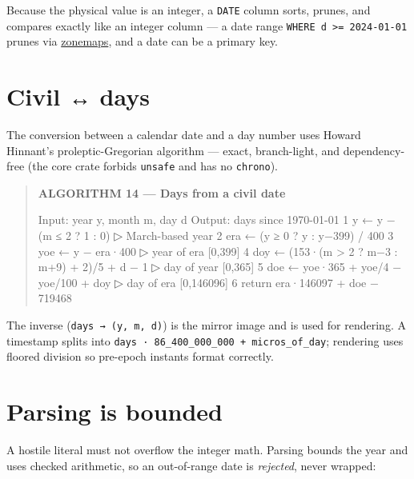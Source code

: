 \documentclass[
  11pt,
  openany]{book}
\newenvironment{Shaded}{}{}
\newcommand{\NormalTok}[1]{#1}
\begin{document}
Because the physical value is an integer, a \texttt{DATE} column sorts,
prunes, and compares exactly like an integer column --- a date range
\texttt{WHERE\ d\ \textgreater{}=\ \textquotesingle{}2024-01-01\textquotesingle{}}
prunes via \href{storage.md}{zonemaps}, and a date can be a primary key.

\section{Civil ↔ days}\label{civil-days}

The conversion between a calendar date and a day number uses Howard
Hinnant's proleptic-Gregorian algorithm --- exact, branch-light, and
dependency-free (the core crate forbids \texttt{unsafe} and has no
\texttt{chrono}).

\begin{quote}
\textbf{ALGORITHM 14 --- Days from a civil date}

\begin{Shaded}
\begin{Highlighting}[]
\NormalTok{Input:  year y, month m, day d}
\NormalTok{Output: days since 1970{-}01{-}01}
\NormalTok{1  y ← y − (m ≤ 2 ? 1 : 0)                            ▷ March{-}based year}
\NormalTok{2  era ← (y ≥ 0 ? y : y−399) / 400}
\NormalTok{3  yoe ← y − era·400                                   ▷ year of era  [0,399]}
\NormalTok{4  doy ← (153·(m \textgreater{} 2 ? m−3 : m+9) + 2)/5 + d − 1       ▷ day of year  [0,365]}
\NormalTok{5  doe ← yoe·365 + yoe/4 − yoe/100 + doy               ▷ day of era   [0,146096]}
\NormalTok{6  return era·146097 + doe − 719468}
\end{Highlighting}
\end{Shaded}
\end{quote}

The inverse (\texttt{days\ →\ (y,\ m,\ d)}) is the mirror image and is
used for rendering. A timestamp splits into
\texttt{days\ ·\ 86\_400\_000\_000\ +\ micros\_of\_day}; rendering uses
floored division so pre-epoch instants format correctly.

\section{Parsing is bounded}\label{parsing-is-bounded}

A hostile literal must not overflow the integer math. Parsing bounds the
year and uses checked arithmetic, so an out-of-range date is
\emph{rejected}, never wrapped:
\end{document}
